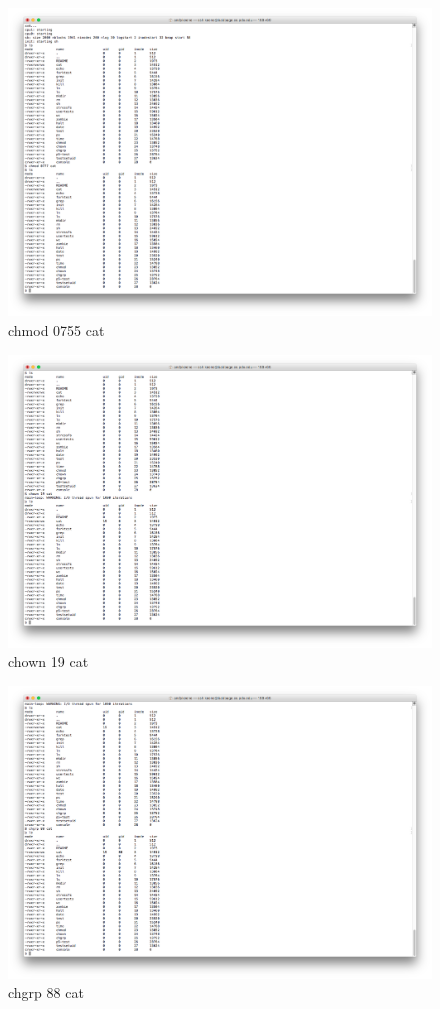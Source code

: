 \documentclass[11pt,letterpaper]{report}
\begin{document}
\begin{figure}[h!]
\centering
\includegraphics[width=0.8\linewidth]{validchmod.png}
\caption{chmod 0755 cat}
\label{fig:datetest}
\end{figure}

\pagebreak

\begin{figure}[h!]
\centering
\includegraphics[width=0.8\linewidth]{validchown.png}
\caption{chown 19 cat}
\label{fig:datetest}
\end{figure}

\pagebreak

\begin{figure}[h!]
\centering
\includegraphics[width=0.8\linewidth]{validchgrp.png}
\caption{chgrp 88 cat}
\label{fig:datetest}
\end{figure}
\end{document}
